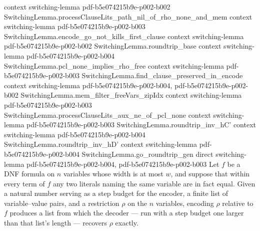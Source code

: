 \begin{lemma}
  {context}
  {switching-lemma}
  {pdf-b5e074215b9e-p002-b002}
\proofstep
  {SwitchingLemma.processClauseLits_path_nil_of_rho_none_and_mem}
  {context}
  {switching-lemma}
  {pdf-b5e074215b9e-p002-b003}
\proofstep
  {SwitchingLemma.encode_go_not_kills_first_clause}
  {context}
  {switching-lemma}
  {pdf-b5e074215b9e-p002-b002}
\proofstep
  {SwitchingLemma.roundtrip_base}
  {context}
  {switching-lemma}
  {pdf-b5e074215b9e-p002-b004}
\proofstep
  {SwitchingLemma.pcl_none_implies_rho_free}
  {context}
  {switching-lemma}
  {pdf-b5e074215b9e-p002-b003}
\proofstep
  {SwitchingLemma.find_clause_preserved_in_encode}
  {context}
  {switching-lemma}
  {pdf-b5e074215b9e-p002-b004,
    pdf-b5e074215b9e-p002-b002}
\proofstep
  {SwitchingLemma.mem_filter_freeVars_zipIdx}
  {context}
  {switching-lemma}
  {pdf-b5e074215b9e-p002-b003}
\proofstep
  {SwitchingLemma.processClauseLits_aux_ne_of_pcl_none}
  {context}
  {switching-lemma}
  {pdf-b5e074215b9e-p002-b003}
\proofstep
  {SwitchingLemma.roundtrip_inv_hC'}
  {context}
  {switching-lemma}
  {pdf-b5e074215b9e-p002-b004}
\proofstep
  {SwitchingLemma.roundtrip_inv_hD'}
  {context}
  {switching-lemma}
  {pdf-b5e074215b9e-p002-b004}
\proofstep
  {SwitchingLemma.go_roundtrip_gen}
  {direct}
  {switching-lemma}
  {pdf-b5e074215b9e-p002-b004,
    pdf-b5e074215b9e-p002-b003}
Let $f$ be a DNF formula on $n$ variables whose width is at most $w$, and suppose that
within every term of $f$ any two literals naming the same variable are in fact equal.
Given a natural number serving as a step budget for the encoder, a finite list of
variable–value pairs, and a restriction $\rho$ on the $n$ variables, encoding $\rho$
relative to $f$ produces a list from which the decoder — run with a step budget one
larger than that list's length — recovers $\rho$ exactly.
\end{lemma}

